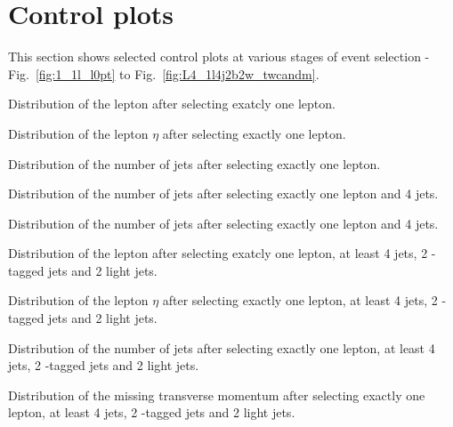 



\clearpage
\section{Control plots}
\label{sec:control_plots}

This section shows selected control plots at various stages of event selection - Fig.~\ref{fig:1_1l_l0pt} to Fig.~\ref{fig:L4_1l4j2b2w_twcandm}.

{Distribution of the lepton \pt after selecting exatcly one lepton.}

{Distribution of the lepton $\eta$ after selecting exactly one lepton.}

{Distribution of the number of jets after selecting exactly one lepton.}

{Distribution of the number of jets after selecting exactly one lepton and 4 jets.}

{Distribution of the number of jets after selecting exactly one lepton and 4 jets.}

{Distribution of the lepton \pt after selecting exatcly one lepton, at least 4 jets, 2 \cPqb-tagged jets and 2 light jets.}

{Distribution of the lepton $\eta$ after selecting exactly one lepton, at least 4 jets, 2 \cPqb-tagged jets and 2 light jets.}

{Distribution of the number of jets after selecting exactly one lepton, at least 4 jets, 2 \cPqb-tagged jets and 2 light jets.}

{Distribution of the missing transverse momentum after selecting exactly one lepton, at least 4 jets, 2 \cPqb-tagged jets and 2 light jets.}

